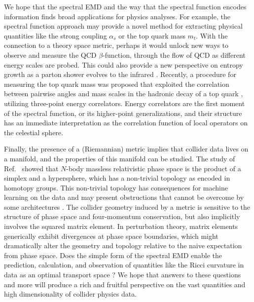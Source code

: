 \documentclass[letterpaper,11pt]{article}
\DeclareRobustCommand{\InRef}[1]{Ref.~\cite{#1}}
\begin{document}
We hope that the spectral EMD and the way that the spectral function encodes information finds broad applications for physics analyses.
%
For example, the spectral function approach may provide a novel method for extracting physical quantities like the strong coupling $\alpha_s$ or the top quark mass $m_t$.
%
With the connection to a theory space metric, perhaps it would unlock new ways to observe and measure the QCD $\beta$-function, through the flow of QCD as different energy scales are probed.
%
This could also provide a new perspective on entropy growth as a parton shower evolves to the infrared \cite{Neill:2018uqw,Cheung:2023hkq}.
%
Recently, a procedure for measuring the top quark mass was proposed that exploited the correlation between pairwise angles and mass scales in the hadronic decay of a top quark \cite{Holguin:2022epo}, utilizing three-point energy correlators.
%
Energy correlators are the first moment of the spectral function, or its higher-point generalizations, and their structure has an immediate interpretation as the correlation function of local operators on the celestial sphere.


Finally, the presence of a (Riemannian) metric implies that collider data lives on a manifold, and the properties of this manifold can be studied.
%
The study of \InRef{Larkoski:2020thc} showed that $N$-body massless relativistic phase space is the product of a simplex and a hypersphere, which has a non-trivial topology as encoded in homotopy groups.  
%
This non-trivial topology has consequences for machine learning on the data and may present obstructions that cannot be overcome by some architectures \cite{Batson:2021agz}.
%
The collider geometry induced by a metric is sensitive to the structure of phase space and four-momentum conservation, but also implicitly involves the squared matrix element.
%
In perturbation theory, matrix elements generically exhibit divergences at phase space boundaries, which might dramatically alter the geometry and topology relative to the naive expectation from phase space.
%
Does the simple form of the spectral EMD enable the prediction, calculation, and observation of quantities like the Ricci curvature in data as an optimal transport space \cite{lott2009ricci}?
%
We hope that answers to these questions and more will produce a rich and fruitful perspective on the vast quantities and high dimensionality of collider physics data.
\end{document}

